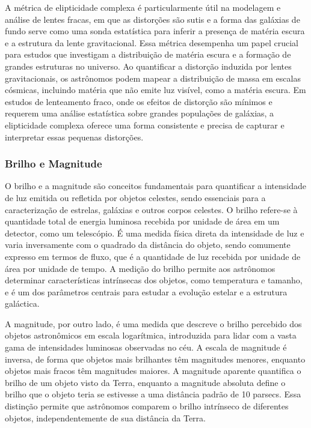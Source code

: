 A métrica de elipticidade complexa é particularmente útil na modelagem e análise de lentes fracas, em que as distorções são sutis e a forma das galáxias de fundo serve como uma sonda estatística para inferir a presença de matéria escura e a estrutura da lente gravitacional. Essa métrica desempenha um papel crucial para estudos que investigam a distribuição de matéria escura e a formação de grandes estruturas no universo. Ao quantificar a distorção induzida por lentes gravitacionais, os astrônomos podem mapear a distribuição de massa em escalas cósmicas, incluindo matéria que não emite luz visível, como a matéria escura. Em estudos de lenteamento fraco, onde os efeitos de distorção são mínimos e requerem uma análise estatística sobre grandes populações de galáxias, a elipticidade complexa oferece uma forma consistente e precisa de capturar e interpretar essas pequenas distorções.


\subsubsection{Brilho e Magnitude}
\label{sec:magnitude}

O brilho e a magnitude são conceitos fundamentais para quantificar a intensidade de luz emitida ou refletida por objetos celestes, sendo essenciais para a caracterização de estrelas, galáxias e outros corpos celestes. O brilho refere-se à quantidade total de energia luminosa recebida por unidade de área em um detector, como um telescópio. É uma medida física direta da intensidade de luz e varia inversamente com o quadrado da distância do objeto, sendo comumente expresso em termos de fluxo, que é a quantidade de luz recebida por unidade de área por unidade de tempo. A medição do brilho permite aos astrônomos determinar características intrínsecas dos objetos, como temperatura e tamanho, e é um dos parâmetros centrais para estudar a evolução estelar e a estrutura galáctica.

A magnitude, por outro lado, é uma medida que descreve o brilho percebido dos objetos astronômicos em escala logarítmica, introduzida para lidar com a vasta gama de intensidades luminosas observadas no céu. A escala de magnitude é inversa, de forma que objetos mais brilhantes têm magnitudes menores, enquanto objetos mais fracos têm magnitudes maiores. A magnitude aparente quantifica o brilho de um objeto visto da Terra, enquanto a magnitude absoluta define o brilho que o objeto teria se estivesse a uma distância padrão de 10 parsecs. Essa distinção permite que astrônomos comparem o brilho intrínseco de diferentes objetos, independentemente de sua distância da Terra.


